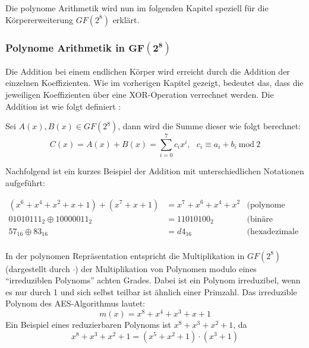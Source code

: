  Die polynome Arithmetik wird nun im folgenden Kapitel speziell für die Körpererweiterung
 $GF(2^8)$ erklärt.
 
 \subsubsection[Polynome Arithmetik in $GF(2^8)$ (Heumann)]{Polynome Arithmetik in $\mathbf{GF(2^8)}$}
 \label{polynome-arithmetic}
 Die Addition bei einem endlichen Körper wird erreicht durch die Addition der einzelnen Koeffizienten. Wie
 im vorherigen Kapitel gezeigt, bedeutet das, dass die jeweiligen Koeffizienten über eine XOR-Operation
 verrechnet werden. Die Addition ist wie folgt definiert \cite{paar10}:
 
 \begin{center}
  \parbox{14cm}{\centering
   Sei $A(x), B(x) \in GF(2^8)$, dann wird die Summe dieser wie folgt berechnet:
   \begin{equation*}
    C(x) = A(x) + B(x) = \sum_{i=0}^7 c_ix^i, ~~~ c_i \equiv a_i + b_i ~\text{mod}~ 2
   \end{equation*}
  }
 \end{center} 
 
 Nachfolgend ist ein kurzes Beispiel der Addition mit unterschiedlichen Notationen
 aufgeführt:
 
 \begin{equation}
  \begin{aligned}
   (x^6 + x^4 +x^2 + x + 1) + (x^7 + x + 1) &= x^7 + x^6 + x^4 + x^2 & \text{(polynome Notation)} &\\
   01010111_2 \oplus 10000011_2 &= 11010100_2 & \text{(binäre Notation)} &\\
   57_{16} \oplus 83_{16} &= d4_{16} & \text{(hexadezimale Notation)} &\\
  \end{aligned}
  \label{math:addition}
 \end{equation}
 
 In der polynomen Repräsentation entspricht die Multiplikation in $GF(2^8)$ (dargestellt durch $\cdot$) der
 Multiplikation von Polynomen modulo eines ``irreduziblen Polynoms'' achten Grades. Dabei ist ein Polynom
 irreduzibel, wenn es nur durch 1 und sich selbst teilbar ist ähnlich einer Primzahl. Das irreduzible
 Polynom des AES-Algorithmus lautet:
  \begin{equation}
   m(x) = x^8 + x^4 + x^3 + x + 1
  \label{math:aes-polynom}
  \end{equation}
 Ein Beispiel eines reduzierbaren Polynoms ist $x^8 +x^3 + x^2 + 1$, da
 \begin{equation*}
   x^8 +x^3 + x^2 + 1 = (x^5 + x^2 + 1) \cdot (x^3 + 1)
 \end{equation*}
 
